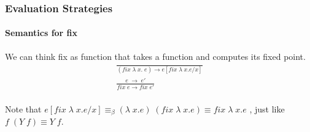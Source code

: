 \documentclass[xcolor=table]{beamer}
\begin{document}
\begin{frame}
\frametitle{Evaluation Strategies}
\framesubtitle{Semantics for fix}
\begin{block}{We can think fix as function that takes a function and computes its fixed point.}
\begin{gather*}
\frac{}{ (fix \; \lambda \;x.\;e) \rightarrow e[fix \; \lambda \; x. e/x]} \\[0.3cm]
\frac{e\;\rightarrow\;e'}{fix \; e \rightarrow fix \; e'} \\[0.3cm]
\end{gather*}

Note that $e[fix \; \lambda \; x. e/x] \equiv_\beta (\lambda\; x. e) \; (fix \; \lambda \; x. e) \equiv fix \; \lambda \; x. e$ ,
just like $f \;(Y\; f) \equiv Y \; f$.
\end{block}
\end{frame}
\end{document}
